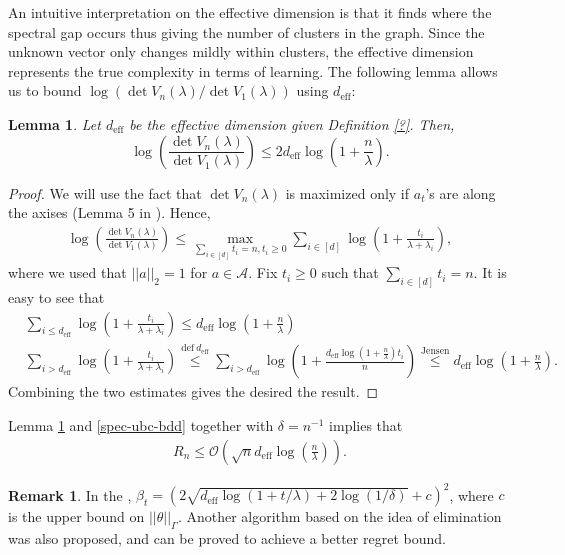 \documentclass[letterpaper,11pt,openright,openany]{book}
\numberwithin{equation}{section}
\theoremstyle{plain}
\newtheorem{Lemma}[Th]{Lemma}
\theoremstyle{definition}
\newtheorem{Rem}[Th]{Remark}
\def\t{{\theta}}
\begin{document}
An intuitive interpretation on the effective dimension is that it finds where the spectral gap occurs thus giving the number of clusters in the graph. Since the unknown vector only changes mildly within clusters, the effective dimension represents the true complexity in terms of learning. 
The following lemma allows us to bound $\log(\det V_n(\lambda)/\det V_1(\lambda))$ using $d_{\text{eff}}$:

\begin{Lemma}\label{effd}
Let $d_{\text{eff}}$ be the effective dimension given Definition \ref{?}. Then, 
$$\log\left(\frac{\det V_n(\lambda)}{\det V_1(\lambda)}\right)\leq 2d_{\text{eff}}\log\left(1+\frac{n}{\lambda}\right).$$ 
\end{Lemma}
\begin{proof}
We will use the fact that $\det V_n(\lambda)$ is maximized only if $a_t$'s are along the axises (Lemma 5 in \cite{valko2014spectral}). Hence, 
\begin{align*}
\log\left(\frac{\det V_n(\lambda)}{\det V_1(\lambda)}\right)\leq\max_{\sum_{i\in [d]}t_i = n, t_i\geq 0 }\sum_{i\in [d]}\log\left(1+\frac{t_i}{\lambda+\lambda_i}\right),
\end{align*}
where we used that $||a||_2=1$ for $a\in\mathcal A$. Fix $t_i\geq 0$ such that $\sum_{i\in [d]}t_i = n$. It is easy to see that
\begin{align*}
&\sum_{i\leq d_{\text{eff}}}\log\left(1+\frac{t_i}{\lambda+\lambda_i}\right)\leq d_{\text{eff}}\log\left(1+\frac{n}{\lambda}\right)\\
&\sum_{i> d_{\text{eff}}}\log\left(1+\frac{t_i}{\lambda+\lambda_i}\right)\stackrel{\text{def} \ 
 d_{\text{eff}}}{\leq}\sum_{i> d_{\text{eff}}}\log\left(1+\frac{d_{\text{eff}}\log(1+\frac{n}{\lambda})t_i}{n}\right)\stackrel{\text{Jensen}}{\leq} d_{\text{eff}}\log\left(1+\frac{n}{\lambda}\right).  
\end{align*}
Combining the two estimates gives the desired the result. 
\end{proof}
Lemma \ref{effd} and \eqref{spec-ubc-bdd} together with $\delta = n^{-1}$ implies that\begin{align*}
R_n \leq \mathcal O\left(\sqrt{n}d_{\text{eff}}\log\left(\frac{n}{\lambda}\right)\right).
\end{align*}
\begin{Rem}
In the \cite{valko2014spectral}, $\beta_t = (2\sqrt{d_{\text{eff}}\log(1+t/\lambda)+2\log(1/\delta)}+c)^2$, where $c$ is the upper bound on $||\t||_\Gamma$. Another algorithm based on the idea of elimination was also proposed, and can be proved to achieve a better regret bound. 
\end{Rem}
\end{document}

